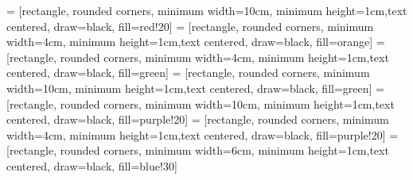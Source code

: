 = [rectangle, rounded corners, minimum width=10cm, minimum height=1cm,text centered, draw=black, fill=red!20]
 = [rectangle, rounded corners, minimum width=4cm, minimum height=1cm,text centered, draw=black, fill=orange]
 = [rectangle, rounded corners, minimum width=4cm, minimum height=1cm,text centered, draw=black, fill=green]
 = [rectangle, rounded corners, minimum width=10cm, minimum height=1cm,text centered, draw=black, fill=green]
 = [rectangle, rounded corners, minimum width=10cm, minimum height=1cm,text centered, draw=black, fill=purple!20]
 = [rectangle, rounded corners, minimum width=4cm, minimum height=1cm,text centered, draw=black, fill=purple!20]
 = [rectangle, rounded corners, minimum width=6cm, minimum height=1cm,text centered, draw=black, fill=blue!30]

